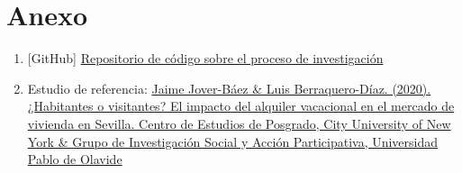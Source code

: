 \documentclass[a4paper,10pt]{article}
\begin{document}
    \hypertarget{anexo}{}
    \section*{Anexo}
        \begin{enumerate}
            \item \hypertarget{github}{[GitHub] \href{https://github.com/m7pantoja/TouristRental}{Repositorio de código sobre el proceso de investigación}}
            \item Estudio de referencia: \href{https://recyt.fecyt.es/index.php/CyTET/article/view/86498/63858}{Jaime Jover-Báez \&
            Luis Berraquero-Díaz. (2020). ¿Habitantes o visitantes? El impacto del alquiler vacacional en el mercado de vivienda en Sevilla. 
            Centro de Estudios de Posgrado, City University of New York \& Grupo de Investigación Social y Acción Participativa, Universidad Pablo de Olavide}
        \end{enumerate}
\end{document}
